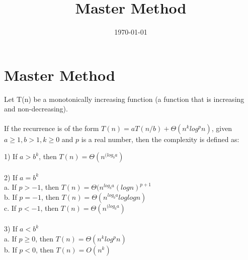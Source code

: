 \documentclass[a4paper, 12pt]{article}
\begin{document}
\title{Master Method}
\date{\today}
\pagestyle{empty} 
\section*{Master Method}
Let T(n) be a monotonically increasing function (a function that is increasing and non-decreasing).\\
	\\
	If the recurrence is of the form $T(n) = aT(n/b) + \Theta(n^k log^p n)$, given $a \geq 1, b > 1, k \geq 0$ and $p$ is a real number, then the complexity is defined as:\\
	
\begin{tabbing}
1) If $a > b^k$, then $T(n) = \Theta(n^{(log_b a})$ \\
\\
2) If $a = b^k$ \=\\
\> a. If $p > -1$, then $T(n) = \Theta(n^{log_b a} (log n)^{p+1}$	\\
\> b. If $p = -1$, then $T(n) = \Theta(n^{log_b a} log log n)$ \\
\> c. If $p < -1$, then $T(n) = \Theta(n^{(log_b a})$\\
\\
3) If $a < b^k$ \\
\> a. If $p \geq 0$, then $T(n) = \Theta(n^k log^p n)$\\
\> b. If $p < 0$, then $T(n) = O(n^k)$ \\
\end{tabbing}
\end{document}
